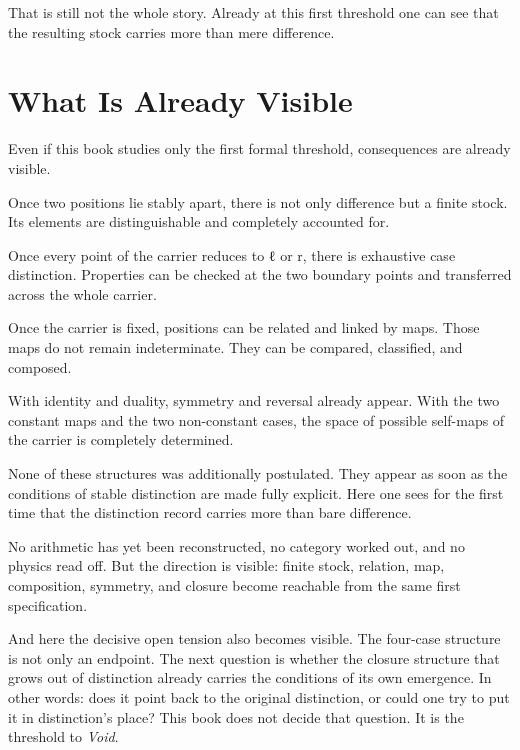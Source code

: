 \documentclass[11pt,a4paper]{book}
\def\texttt#1{#1}%
\begin{document}
That is still not the whole story. Already at this first threshold one can
see that the resulting stock carries more than mere difference.

\chapter{What Is Already Visible}
\label{ch:already-visible}

Even if this book studies only the first formal threshold, consequences are
already visible.

Once two positions lie stably apart, there is not only difference but a
finite stock. Its elements are distinguishable and completely accounted for.

Once every point of the carrier reduces to \texttt{ℓ} or \texttt{r}, there
is exhaustive case distinction. Properties can be checked at the two
boundary points and transferred across the whole carrier.

Once the carrier is fixed, positions can be related and linked by maps.
Those maps do not remain indeterminate. They can be compared, classified,
and composed.

With identity and duality, symmetry and reversal already appear. With the
two constant maps and the two non-constant cases, the space of possible
self-maps of the carrier is completely determined.

None of these structures was additionally postulated. They appear as soon as
the conditions of stable distinction are made fully explicit. Here one sees
for the first time that the distinction record carries more than bare
difference.

No arithmetic has yet been reconstructed, no category worked out, and no
physics read off. But the direction is visible: finite stock, relation, map,
composition, symmetry, and closure become reachable from the same first
specification.

And here the decisive open tension also becomes visible. The four-case
structure is not only an endpoint. The next question is whether the closure
structure that grows out of distinction already carries the conditions of
its own emergence. In other words: does it point back to the original
distinction, or could one try to put it in distinction's place? This book
does not decide that question. It is the threshold to \textit{Void}.
\end{document}
